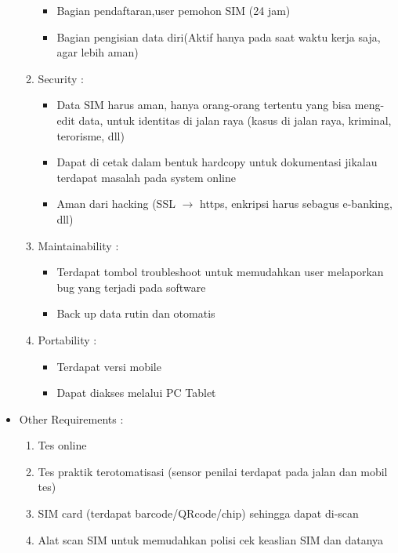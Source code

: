 \documentclass[paper=a4, fontsize=11pt]{scrartcl}
\numberwithin{equation}{section} %
\numberwithin{figure}{section} %
\numberwithin{table}{section} %
\begin{document}
\begin{itemize}
\begin{enumerate}
		\begin{itemize}
			\item Bagian pendaftaran,user pemohon SIM (24 jam)
			\item Bagian pengisian data diri(Aktif hanya pada saat waktu kerja saja, agar lebih aman)
		\end{itemize}
		\item Security :
		\begin{itemize}
			\item Data SIM harus aman, hanya orang-orang tertentu yang bisa meng-edit data, untuk identitas di jalan raya (kasus di jalan raya, kriminal, terorisme, dll)
			\item Dapat di cetak dalam bentuk hardcopy untuk dokumentasi jikalau terdapat masalah pada system online
			\item Aman dari hacking (SSL $ \rightarrow $ https, enkripsi harus sebagus e-banking, dll)
		\end{itemize}
		\item Maintainability :
		\begin{itemize}
			\item Terdapat tombol troubleshoot untuk memudahkan user melaporkan bug yang terjadi pada software
			\item Back up data rutin dan otomatis
		\end{itemize}
		\item Portability :
		\begin{itemize}
			\item Terdapat versi mobile
			\item Dapat diakses melalui PC Tablet
		\end{itemize}
	\end{enumerate}
	\item Other Requirements :
	\begin{enumerate}
		\item Tes online
		\item Tes praktik terotomatisasi (sensor penilai terdapat pada jalan dan mobil tes)
		\item SIM card (terdapat barcode/QRcode/chip) sehingga dapat di-scan
		\item Alat scan SIM untuk memudahkan polisi cek keaslian SIM dan datanya
	\end{enumerate}
\end{itemize}
\end{document}
